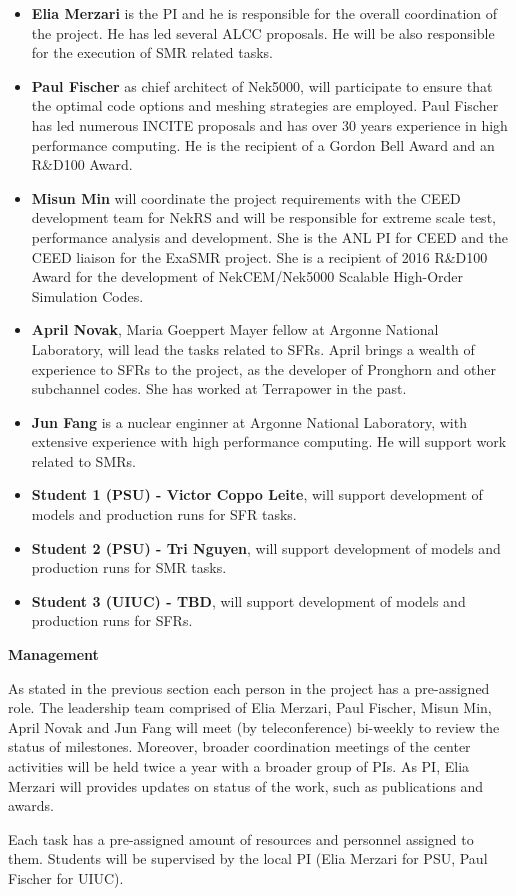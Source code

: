 \documentclass[11pt,letterpaper,english]{article}
\begin{document}
\vspace{-.15in}
\begin{itemize}
\item \textbf{Elia Merzari} is the PI and he is responsible for the overall coordination of the project. He has led several ALCC proposals. He will be also responsible for the execution of SMR related tasks.
\item \textbf{Paul Fischer} as chief architect of Nek5000, will participate to ensure that the optimal code options and meshing strategies are employed. Paul Fischer has led numerous INCITE proposals and has over 30 years experience in high performance computing. He is the recipient of a Gordon Bell Award and an R\&D100 Award.
\item \textbf{Misun Min} will coordinate the project requirements with the CEED development team for NekRS and will be responsible for extreme scale test, performance analysis and development.
She is the ANL PI for CEED and the CEED liaison for the ExaSMR project. She is a recipient of 2016 R\&D100 Award for the development of NekCEM/Nek5000 Scalable High-Order Simulation Codes.
\item \textbf{April Novak}, Maria Goeppert Mayer fellow at Argonne National Laboratory, will lead the tasks related to SFRs. April brings a wealth of experience to SFRs to the project, as the developer of Pronghorn and other subchannel codes. She has worked at Terrapower in the past.
\item \textbf{Jun Fang} is a nuclear enginner at Argonne National Laboratory, with extensive experience with high performance computing.  He will support work related to SMRs.
\item \textbf{Student 1 (PSU) - Victor Coppo Leite}, will support development of models and production runs for SFR tasks.
\item \textbf{Student 2 (PSU) - Tri Nguyen}, will support development of models and production runs for SMR tasks.
\item \textbf{Student 3 (UIUC) - TBD}, will support development of models and production runs for SFRs.
\end{itemize}

{\noindent \bf  {Management}}

\noindent As stated in the previous section each person in the project has a pre-assigned role. The leadership team comprised of Elia Merzari, Paul Fischer, Misun Min, April Novak and Jun Fang will meet (by teleconference) bi-weekly to review the status of milestones.  Moreover, broader coordination meetings of the center activities will be held twice a year with a broader group of PIs. As PI, Elia Merzari will provides updates on status of the work, such as publications and awards.

\noindent Each task has a pre-assigned amount of resources and personnel assigned to them. Students will be supervised by the local PI (Elia Merzari for PSU, Paul Fischer for UIUC).
\end{document}
